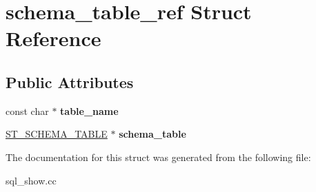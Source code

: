 \hypertarget{structschema__table__ref}{}\section{schema\+\_\+table\+\_\+ref Struct Reference}
\label{structschema__table__ref}
\subsection*{Public Attributes}
\begin{DoxyCompactItemize}
\item 
\mbox{\label{structschema__table__ref_a33e0a7c21dd50aa450b637d3a291c786}} 
const char $\ast$ {\bfseries table\+\_\+name}
\item 
\mbox{\label{structschema__table__ref_a1e1927434f3add14f828e94ff28c13d1}} 
\mbox{\hyperlink{structst__schema__table}{S\+T\+\_\+\+S\+C\+H\+E\+M\+A\+\_\+\+T\+A\+B\+LE}} $\ast$ {\bfseries schema\+\_\+table}
\end{DoxyCompactItemize}


The documentation for this struct was generated from the following file\+:\begin{DoxyCompactItemize}
\item 
sql\+\_\+show.\+cc\end{DoxyCompactItemize}
